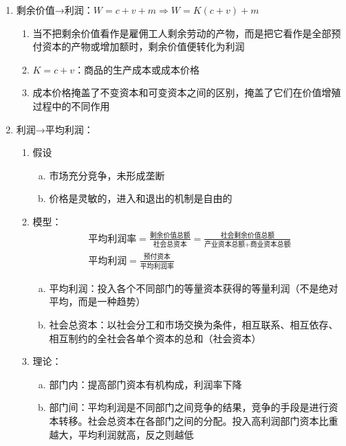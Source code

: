 \documentclass[12pt]{book}
\begin{document}
\begin{enumerate}[1.]
    \item 剩余价值→利润：$W=c+v+m\Rightarrow W=K(c+v)+m$
          \begin{enumerate}[(1)]
              \item 当不把剩余价值看作是雇佣工人剩余劳动的产物，而是把它看作是全部预付资本的产物或增加额时，剩余价值便转化为利润
              \item $K = c + v$：商品的生产成本或成本价格
              \item 成本价格掩盖了不变资本和可变资本之间的区别，掩盖了它们在价值增殖过程中的不同作用
          \end{enumerate}
    \item 利润→平均利润：
          \begin{enumerate}[(1)]
              \item 假设
                    \begin{enumerate}[a.]
                        \item 市场充分竞争，未形成垄断
                        \item 价格是灵敏的，进入和退出的机制是自由的
                    \end{enumerate}
              \item 模型：
                    \begin{gather*}
                        \text{平均利润率}=\frac{\text{剩余价值总额}}{\text{社会总资本}}=\frac{\text{社会剩余价值总额}}{\text{产业资本总额}+\text{商业资本总额}}\\
                        \text{平均利润}=\frac{\text{预付资本}}{\text{平均利润率}}
                    \end{gather*}
                    \begin{enumerate}[a.]
                        \item 平均利润：投入各个不同部门的等量资本获得的等量利润（不是绝对平均，而是一种趋势）
                        \item 社会总资本：以社会分工和市场交换为条件，相互联系、相互依存、相互制约的全社会各单个资本的总和（社会资本）
                    \end{enumerate}
              \item 理论：
                    \begin{enumerate}[a.]
                        \item 部门内：提高部门资本有机构成，利润率下降
                        \item 部门间：平均利润是不同部门之间竞争的结果，竞争的手段是进行资本转移。社会总资本在各部门之间的分配。投入高利润部门资本比重越大，平均利润就高，反之则越低

\end{enumerate}
\end{enumerate}
\end{enumerate}
\end{document}
